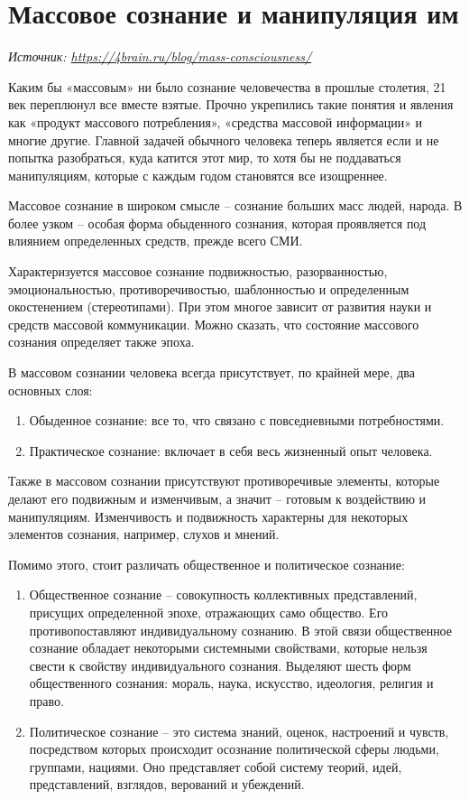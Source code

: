 \newpage
\section{Массовое сознание и манипуляция им}

\textit{Источник: \url{https://4brain.ru/blog/mass-consciousness/}}

Каким бы «массовым» ни было сознание человечества в прошлые столетия, 21 век переплюнул все вместе взятые. Прочно укрепились такие понятия и явления как «продукт массового потребления», «средства массовой информации» и многие другие. Главной задачей обычного человека теперь является если и не попытка разобраться, куда катится этот мир, то хотя бы не поддаваться манипуляциям, которые с каждым годом становятся все изощреннее.

Массовое сознание в широком смысле – сознание больших масс людей, народа. В более узком – особая форма обыденного сознания, которая проявляется под влиянием определенных средств, прежде всего СМИ.

Характеризуется массовое сознание подвижностью, разорванностью, эмоциональностью, противоречивостью, шаблонностью и определенным окостенением (стереотипами). При этом многое зависит от развития науки и средств массовой коммуникации. Можно сказать, что состояние массового сознания определяет также эпоха.

В массовом сознании человека всегда присутствует, по крайней мере, два основных слоя:

\begin{enumerate}
    \item Обыденное сознание: все то, что связано с повседневными потребностями.
    \item Практическое сознание: включает в себя весь жизненный опыт человека.
\end{enumerate}

Также в массовом сознании присутствуют противоречивые элементы, которые делают его подвижным и изменчивым, а значит – готовым к воздействию и манипуляциям. Изменчивость и подвижность характерны для некоторых элементов сознания, например, слухов и мнений.

Помимо этого, стоит различать общественное и политическое сознание:

\begin{enumerate}
    \item Общественное сознание – совокупность коллективных представлений, присущих определенной эпохе, отражающих само общество. Его противопоставляют индивидуальному сознанию. В этой связи общественное сознание обладает некоторыми системными свойствами, которые нельзя свести к свойству индивидуального сознания. Выделяют шесть форм общественного сознания: мораль, наука, искусство, идеология, религия и право.
    \item Политическое сознание – это система знаний, оценок, настроений и чувств, посредством которых происходит осознание политической сферы людьми, группами, нациями. Оно представляет собой систему теорий, идей, представлений, взглядов, верований и убеждений.
\end{enumerate}

